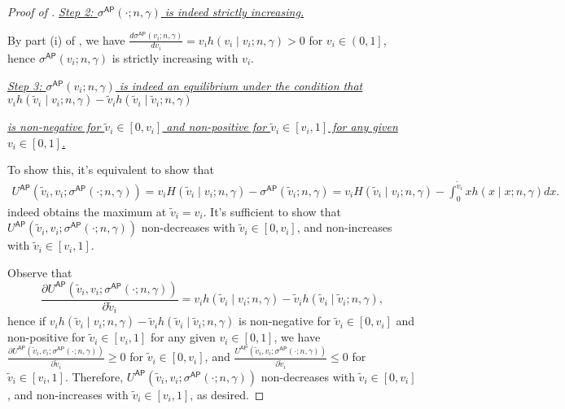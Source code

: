 \begin{proof}[{Proof of }]
 \medskip 

\noindent\textit{\underline{Step 2: $\sigma^{\mathsf{AP}}(\cdot;n, \gamma)$ is indeed strictly increasing.}}

 \medskip
\noindent By part (i) of , we have  
$\frac{d \sigma^{\mathsf{AP}}({v}_i;n,\gamma)}{d{v}_i} = v_i h(v_i\mid v_i; n,\gamma)>0$ for $v_i \in \left(0,1\right]$, hence $\sigma^{\mathsf{AP}}(v_i;n, \gamma)$ is strictly increasing with $v_i$.

 \medskip
\noindent\textit{\underline{Step 3: $\sigma^{\mathsf{AP}}(v_i;n, \gamma)$ is indeed an equilibrium under the condition that $v_i h(\tilde{v}_i\mid v_i;n,\gamma) - \tilde{v}_i h(\tilde{v}_i\mid \tilde{v}_i;n,\gamma)$}}

\noindent\textit{\underline{is non-negative for $\tilde{v}_i\in [0,v_i]$ and non-positive for $\tilde{v}_i\in [v_i,1]$ for any given $v_i\in [0,1]$.}}
\medskip

\noindent To show this, it's equivalent to show that
\begin{align*}
    U^{\mathsf{AP}}(\tilde{v}_i,v_i;\sigma^{\mathsf{AP}}(\cdot;n,\gamma))= v_i H(\tilde{v}_i\mid v_i; n, \gamma) - \sigma^{\mathsf{AP}}(\tilde{v}_i;n, \gamma) = v_i H(\tilde{v}_i\mid v_i; n, \gamma) - \int_0^{\tilde{v}_i} x h(x\mid x;n, \gamma)dx.
\end{align*}
indeed obtains the maximum at $\tilde{v}_i = v_i$. It's sufficient to show that $U^{\mathsf{AP}}(\tilde{v}_i,v_i;\sigma^{\mathsf{AP}}(\cdot;n,\gamma))$ non-decreases with $\tilde{v}_i \in [0, v_i]$, and non-increases with $\tilde{v}_i \in [v_i, 1]$.

Observe that
$$\frac{\partial U^{\mathsf{AP}}(\tilde{v}_i,v_i;\sigma^{\mathsf{AP}}(\cdot;n,\gamma))}{\partial \tilde{v}_i} = v_ih(\tilde{v}_i\mid {v}_i;n, \gamma) -  \tilde{v}_ih(\tilde{v}_i \mid \tilde{v}_i;n, \gamma),$$ 
hence if $v_i h(\tilde{v}_i\mid v_i;n,\gamma) - \tilde{v}_i h(\tilde{v}_i\mid \tilde{v}_i;n,\gamma)$ is non-negative for $\tilde{v}_i\in [0,v_i]$ and non-positive for $\tilde{v}_i\in [v_i,1]$ for any given $v_i\in [0,1]$, we have $\frac{\partial U^{\mathsf{AP}}(\tilde{v}_i,v_i;\sigma^{\mathsf{AP}}(\cdot;n,\gamma))}{\partial \tilde{v}_i} \geq 0$ for $\tilde{v}_i 
\in [0, v_i]$, and $\frac{U^{\mathsf{AP}}(\tilde{v}_i,v_i;\sigma^{\mathsf{AP}}(\cdot;n,\gamma))}{\partial \tilde{v}_i} \leq 0$ for $\tilde{v}_i \in  [v_i,1]$. Therefore, $U^{\mathsf{AP}}(\tilde{v}_i,v_i;\sigma^{\mathsf{AP}}(\cdot;n,\gamma))$ non-decreases with $\tilde{v}_i \in [0, v_i]$, and non-increases with $\tilde{v}_i \in [v_i, 1]$, as desired.


\end{proof}
